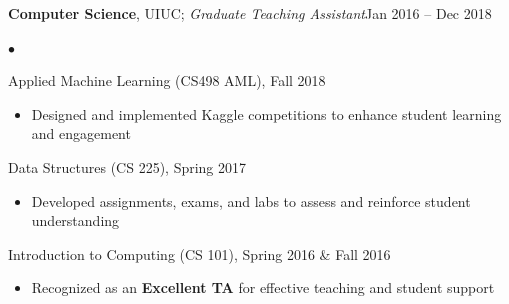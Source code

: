 \documentclass[margin,line]{res}
\newenvironment{list2}{
  \begin{list}{$\bullet$}{%
      \setlength{\itemsep}{0in}
      \setlength{\parsep}{0in} \setlength{\parskip}{0in}
      \setlength{\topsep}{0in} \setlength{\partopsep}{0in} 
      \setlength{\leftmargin}{0.2in}}}{\end{list}}
\begin{document}
\begin{resume}
\textbf{Computer Science}, UIUC; \textit{Graduate Teaching Assistant}{\hfill {Jan 2016 -- Dec 2018}}
\begin{list2}
\item Applied Machine Learning (CS498 AML), Fall 2018
\begin{itemize}[itemsep=-0.5ex]
\item Designed and implemented Kaggle competitions to enhance student learning and engagement
\end{itemize}
\item Data Structures (CS 225), Spring 2017
\begin{itemize}[itemsep=-0.5ex]
\item Developed assignments, exams, and labs to assess and reinforce student understanding
\end{itemize}
\item Introduction to Computing (CS 101), Spring 2016 \& Fall 2016
\begin{itemize}[itemsep=-0.5ex]
\item Recognized as an \textbf{Excellent TA} for effective teaching and student support
\end{itemize}
\end{list2}



\end{resume}
\end{document}
